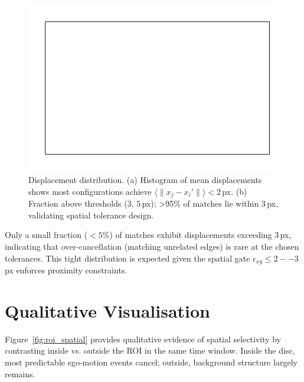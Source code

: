 \begin{figure}[t]
  \centering
  \includegraphics[width=0.85\linewidth]{../code/thesis_figures/figure_displacement_distribution.pdf}
\caption{Displacement distribution. (a) Histogram of mean displacements shows most configurations achieve $\langle \|x_j - x_i'\| \rangle < 2$\,px. (b) Fraction above thresholds (3, 5\,px); >95\% of matches lie within 3\,px, validating spatial tolerance design.}
  \label{fig:displacement}
\end{figure}

Only a small fraction ($< 5\%$) of matches exhibit displacements exceeding 3\,px, indicating that over-cancellation (matching unrelated edges) is rare at the chosen tolerances. This tight distribution is expected given the spatial gate $\epsilon_{xy} \leq 2--3$\,px enforces proximity constraints.

\section{Qualitative Visualisation}

Figure~\ref{fig:roi_spatial} provides qualitative evidence of spatial selectivity by contrasting inside vs. outside the ROI in the same time window. Inside the disc, most predictable ego-motion events cancel; outside, background structure largely remains.

